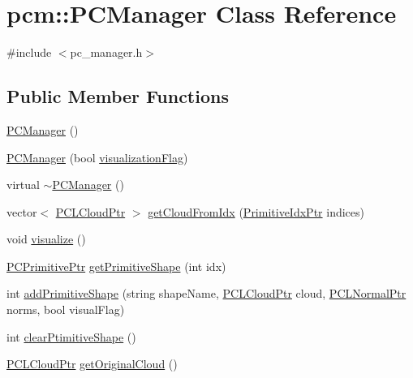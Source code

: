 \hypertarget{classpcm_1_1PCManager}{\section{pcm\-:\-:P\-C\-Manager Class Reference}
\label{classpcm_1_1PCManager}
}


{\ttfamily \#include $<$pc\-\_\-manager.\-h$>$}

\subsection*{Public Member Functions}
\begin{DoxyCompactItemize}
\item 
\hyperlink{classpcm_1_1PCManager_ac9edd680fe7b6e9d8a2358ae8641759e}{P\-C\-Manager} ()
\item 
\hyperlink{classpcm_1_1PCManager_af9dabc49537fa4521e7de8323a686856}{P\-C\-Manager} (bool \hyperlink{classpcm_1_1PCManager_af2215813be83c41ca788a40614c9fadb}{visualization\-Flag})
\item 
virtual \hyperlink{classpcm_1_1PCManager_a488397e09fc7593a54d359ca899d6111}{$\sim$\-P\-C\-Manager} ()
\item 
vector$<$ \hyperlink{pc__primitive_8h_aa14a240c8d999c4f56133c0f70e88783}{P\-C\-L\-Cloud\-Ptr} $>$ \hyperlink{classpcm_1_1PCManager_a73da6d454214f5ba90d978b50ff4438f}{get\-Cloud\-From\-Idx} (\hyperlink{pc__primitive_8h_a6ec0f6fbb026ae4b66cac121673c3a8a}{Primitive\-Idx\-Ptr} indices)
\item 
void \hyperlink{classpcm_1_1PCManager_ad73afae724cbba84e40ed94ac4123864}{visualize} ()
\item 
\hyperlink{pc__manager_8h_a0976ac6881bc2fcf1a5503663203e83f}{P\-C\-Primitive\-Ptr} \hyperlink{classpcm_1_1PCManager_a3575801a21b3fd9613dd57cb97ffaa47}{get\-Primitive\-Shape} (int idx)
\item 
int \hyperlink{classpcm_1_1PCManager_a121d34f52021c5aed1e5133688df8774}{add\-Primitive\-Shape} (string shape\-Name, \hyperlink{pc__primitive_8h_aa14a240c8d999c4f56133c0f70e88783}{P\-C\-L\-Cloud\-Ptr} cloud, \hyperlink{pc__primitive_8h_a1bc38ce8b0c26e5f2d28fae9f3e3ea97}{P\-C\-L\-Normal\-Ptr} norms, bool visual\-Flag)
\item 
int \hyperlink{classpcm_1_1PCManager_a993ec5fee41e0ce3b4f9ce403c86aaec}{clear\-Ptimitive\-Shape} ()
\item 
\hyperlink{pc__primitive_8h_aa14a240c8d999c4f56133c0f70e88783}{P\-C\-L\-Cloud\-Ptr} \hyperlink{classpcm_1_1PCManager_a3f26dafa3a2808b3ee927d9724f9c9a6}{get\-Original\-Cloud} ()

\end{DoxyCompactItemize}
